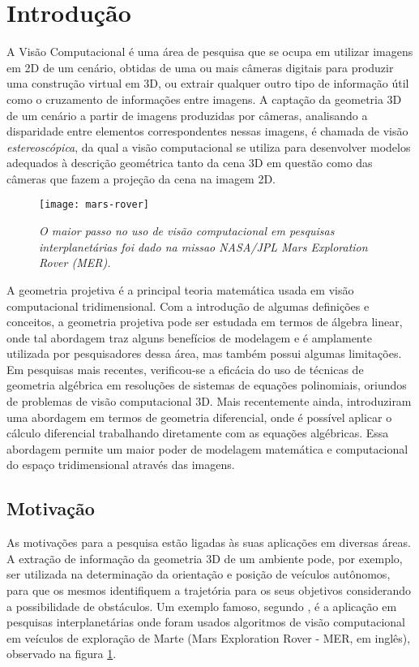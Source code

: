 \newpage
\pagestyle{headings}
\section{Introdução}
A Visão Computacional é uma área de pesquisa que se ocupa em utilizar imagens em 2D de um cenário, obtidas de uma ou mais câmeras digitais para produzir uma construção virtual em 3D, ou extrair qualquer outro tipo de informação útil como o cruzamento de informações entre imagens. A captação da geometria 3D de um cenário a partir de imagens produzidas por câmeras, analisando a disparidade entre elementos correspondentes nessas imagens, é chamada de visão {\it estereoscópica}, da qual a visão computacional se utiliza para desenvolver modelos adequados à descrição geométrica tanto da cena 3D em questão como das câmeras que fazem a projeção da cena na imagem 2D.  

\begin{figure}[!htb]
\centering
\texttt{[image: mars-rover]}
\caption{{\it O maior passo no uso de visão computacional em pesquisas interplanetárias foi dado na missao NASA/JPL Mars Exploration Rover (MER).}}
\label{fig.mars-rover}
\end{figure}

A geometria projetiva é a principal teoria matemática usada em visão computacional tridimensional. Com a introdução de algumas definições e conceitos, a geometria projetiva pode ser estudada em termos de álgebra linear, onde tal abordagem traz alguns benefícios de modelagem e é amplamente utilizada por pesquisadores dessa área, mas também possui algumas limitações. Em pesquisas mais recentes, verificou-se a eficácia do uso de técnicas de geometria algébrica em resoluções de sistemas de equações polinomiais, oriundos de problemas de visão computacional 3D. Mais recentemente ainda, \citep{tese-fabbri} introduziram uma abordagem em termos de geometria diferencial, onde é possível aplicar o cálculo diferencial trabalhando diretamente com as equações algébricas. Essa abordagem permite um maior poder de modelagem matemática e computacional do espaço tridimensional através das imagens.


\subsection*{Motivação}
As motivações para a pesquisa estão ligadas às suas aplicações em diversas áreas. A extração de informação da geometria 3D de um ambiente pode, por exemplo, ser utilizada na determinação da orientação e posição de veículos autônomos, para que os mesmos identifiquem a trajetória para os seus objetivos considerando a possibilidade de obstáculos. Um exemplo famoso, segundo \citep{mars-rover}, é a aplicação em pesquisas interplanetárias onde foram usados algoritmos de visão computacional em veículos de exploração de Marte (Mars Exploration Rover - MER, em inglês), observado na figura \ref{fig.mars-rover}.


